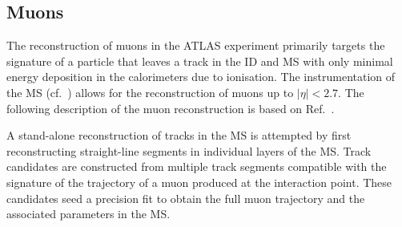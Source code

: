 \subsection{Muons}%
\label{sec:muon_rec}

The reconstruction of muons in the ATLAS experiment primarily targets the
signature of a particle that leaves a track in the ID and MS with only minimal
energy deposition in the calorimeters due to ionisation. The instrumentation of
the MS (cf.~) allows for the reconstruction of muons up to
$|\eta| < 2.7$. The following description of the muon reconstruction is based on
Ref.~\cite{MUON-2018-03}.

A stand-alone reconstruction of tracks in the MS is attempted by first
reconstructing straight-line segments in individual layers of the MS. Track
candidates are constructed from multiple track segments compatible with the
signature of the trajectory of a muon produced at the interaction point. These
candidates seed a precision fit to obtain the full muon trajectory and the
associated parameters in the MS.

